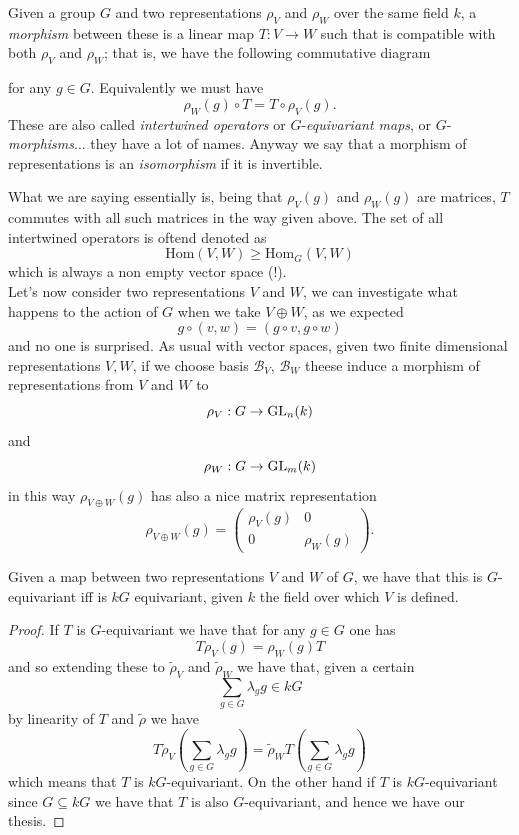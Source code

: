 \documentclass[11pt]{scrartcl}
\begin{document}
	\begin{definition}
		Given a group $G$ and two representations $\rho_V$ and $\rho_W$ over the same field $k$, a \textit{morphism} between these is a linear map $T:V\to W$ such that is compatible with both $\rho_V$ and $\rho_W$; that is, we have the following commutative diagram
		\begin{center}
		\end{center}
		for any $g\in G$. Equivalently we must have
		$$\rho_W(g)\circ T = T \circ \rho_V(g).$$
		These are also called \textit{intertwined operators} or $G$-\textit{equivariant maps}, or $G$-\textit{morphisms}... they have a lot of names. Anyway we say that a morphism of representations is an \textit{isomorphism} if it is invertible.
	\end{definition}
	What we are saying essentially is, being that $\rho_V(g)$ and $\rho_W(g)$ are matrices, $T$ commutes with all such matrices in the way given above. The set of all intertwined operators is oftend denoted as
	$$\text{Hom}(V,W)\ge \text{Hom}_G(V,W)$$
	which is always a non empty vector space (!). \\
	Let's now consider two representations $V$ and $W$, we can investigate what happens to the action of $G$ when we take $V\oplus W$, as we expected
	$$g\circ (v,w)=\left(g\circ v,g\circ w\right)$$
	and no one is surprised. As usual with vector spaces, given two finite dimensional representations $V,W$, if we choose basis $\mathcal{B}_V$, $\mathcal{B}_W$ theese induce a morphism of representations from $V$ and $W$ to
	$$\rho_V:G\to \operatorname{GL}_n(k)$$
	and
	$$\rho_W:G\to \operatorname{GL}_m(k)$$
	in this way $\rho_{V\oplus W}(g)$ has also a nice matrix representation
	$$\rho_{V\oplus W}(g)=
	\left(\begin{array}{c|c}
		\rho_V(g) & 0 \\
		\hline 
		0 & \rho_W(g)
	\end{array}\right).$$
	\begin{lemma}
		Given a map between two representations $V$ and $W$ of $G$, we have that this is $G$-equivariant iff is $kG$ equivariant, given $k$ the field over which $V$ is defined.
	\end{lemma} 
	\begin{proof}
		If $T$ is $G$-equivariant we have that for any $g\in G$ one has
		$$T\rho_V(g)=\rho_W(g)T$$
		and so extending these to $\tilde{\rho}_V$ and $\tilde{\rho}_W$ we have that, given a certain 
		$$\sum_{g\in G}\lambda_gg\in kG$$
		by linearity of $T$ and $\tilde{\rho}$ we have
		$$T\tilde{\rho}_V\left(\sum_{g\in G}\lambda_gg\right)=\tilde{\rho}_WT\left(\sum_{g\in G}\lambda_gg\right)$$
		which means that $T$ is $kG$-equivariant. On the other hand if $T$ is $kG$-equivariant since $G\subseteq kG$ we have that $T$ is also $G$-equivariant, and hence we have our thesis. 
	\end{proof}
\end{document}
